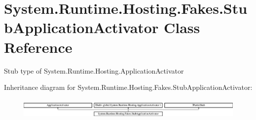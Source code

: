 \hypertarget{class_system_1_1_runtime_1_1_hosting_1_1_fakes_1_1_stub_application_activator}{\section{System.\-Runtime.\-Hosting.\-Fakes.\-Stub\-Application\-Activator Class Reference}
\label{class_system_1_1_runtime_1_1_hosting_1_1_fakes_1_1_stub_application_activator}
}


Stub type of System.\-Runtime.\-Hosting.\-Application\-Activator 


Inheritance diagram for System.\-Runtime.\-Hosting.\-Fakes.\-Stub\-Application\-Activator\-:\begin{figure}[H]
\begin{center}
\leavevmode
\includegraphics[height=1.031308cm]{class_system_1_1_runtime_1_1_hosting_1_1_fakes_1_1_stub_application_activator}
\end{center}
\end{figure}
